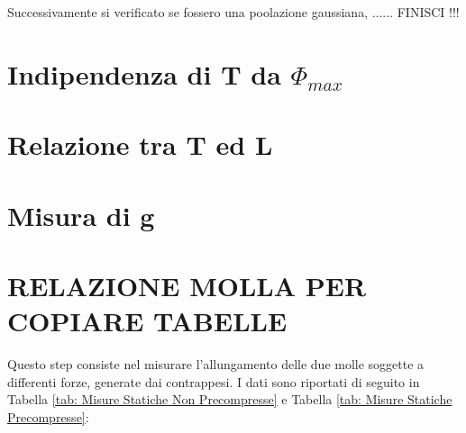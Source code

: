 \documentclass[12pt, a4paper]{article}
\begin{document}
Successivamente si  verificato se fossero una poolazione gaussiana, ...... FINISCI !!!






\section{Indipendenza di T da $\Phi_{max}$}

\section{Relazione tra T ed L}

\section{Misura di g}














\newpage
\section{RELAZIONE MOLLA PER COPIARE TABELLE}
Questo step consiste nel misurare l'allungamento delle due molle soggette a differenti forze, generate dai contrappesi. I dati sono riportati di seguito in Tabella \ref{tab: Misure Statiche Non Precompresse} e Tabella \ref{tab: Misure Statiche Precompresse}:
\\
\end{document}
